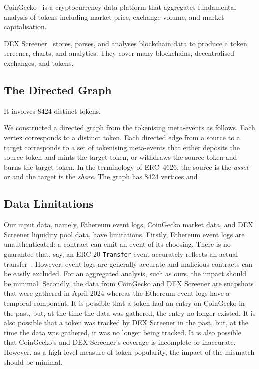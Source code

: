 CoinGecko~\cite{gecko-labs-xx} is a cryptocurrency data platform that
aggregates fundamental analysis of tokens including market price,
exchange volume, and market capitalisation.

DEX Screener~\cite{dex-screener-xx} stores, parses, and analyses
blockchain data to produce a token screener, charts, and analytics.
They cover many blockchains, decentralised exchanges, and tokens.

\subsection{The Directed Graph}\label{sec:data-directed-graph}

It involves \num{8424} distinct tokens.

We constructed a directed graph from the tokenising meta-events as
follows.  Each vertex corresponds to a distinct token.  Each directed
edge from a source to a target corresponds to a set of tokenising
meta-events that either deposits the source token and mints the target
token, or withdraws the source token and burns the target token.  In
the terminology of {ERC}~4626, the source is the \textit{asset} or and
the target is the \textit{share}.  The graph has 8424 vertices and

\subsection{Data Limitations}\label{sec:data-limitations}

Our input data, namely, Ethereum event logs, CoinGecko market data,
and DEX Screener liquidity pool data, have limitations.  Firstly,
Ethereum event logs are unauthenticated: a contract can emit an event
of its choosing.  There is no guarantee that, say, an ERC-20
\texttt{Transfer} event accurately reflects an actual
transfer~\cite{guidi-michienzi-22}.  However, event logs are generally
accurate and malicious contracts can be easily excluded.  For an
aggregated analysis, such as ours, the impact should be minimal.
Secondly, the data from CoinGecko and DEX Screener are snapshots that
were gathered in April 2024 whereas the Ethereum event logs have a
temporal component.  It is possible that a token had an entry on
CoinGecko in the past, but, at the time the data was gathered, the
entry no longer existed.  It is also possible that a token was tracked
by DEX Screener in the past, but, at the time the data was gathered,
it was no longer being tracked.  It is also possible that CoinGecko's
and DEX Screener's coverage is incomplete or inaccurate.  However, as
a high-level measure of token popularity, the impact of the mismatch
should be minimal.
